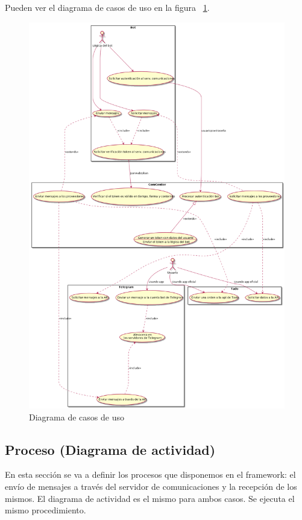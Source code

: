 \documentclass[spanish,12pt, a4paper, twoside]{paper}
\begin{document}
Pueden ver el diagrama de casos de uso en la figura ~\ref{fig:Diagrama de casos de uso}.

\begin{figure}[hp]
\centering
	\includegraphics[width=\textwidth]{recursos/usecases}
\caption{Diagrama de casos de uso}
\label{fig:Diagrama de casos de uso}
\end{figure}

\newpage

\subsection{Proceso (Diagrama de actividad)}

En esta sección se va a definir los procesos que disponemos en el framework: el envío de mensajes a través del servidor de comunicaciones y la recepción de los mismos. El diagrama de actividad es el mismo para ambos casos. Se ejecuta el mismo procedimiento.
\end{document}
